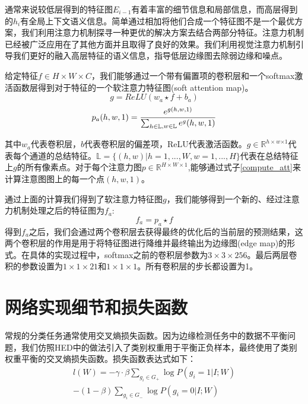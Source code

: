 \documentclass[master]{thesis-uestc}
\begin{document}
{通常来说较低层得到的特征图$E_{i-1}$有着丰富的细节信息和局部信息，而高层得到的$h_i$有全局上下文语义信息。简单通过相加将他们合成一个特征图不是一个最优方案，我们利用注意力机制探寻一种更优的解决方案去结合两部分特征。注意力机制已经被广泛应用在了其他方面并且取得了良好的效果。我们利用视觉注意力机制引导我们更好的融入高层特征的语义信息，指导低层边缘图去除弱边缘和噪点。

给定特征$f \in H \times W \times C$，我们能够通过一个带有偏置项的卷积层和一个softmax激活函数层得到对于特征的一个软注意力特征图(soft attention map)。
\begin{equation}
    g = ReLU(w_{a} \star f + b_{a})
\end{equation}
\begin{equation}
    \label{compute_att}
    {p_{a}(h, w, 1) = \frac{e^{g(h,w, 1)}}{\sum_{\substack{h \in \mathbb{L}}\\ ,w \in \mathbb{L}}  e^{g}(h,w,1)}}
\end{equation}

其中$w_{a}$代表卷积层，$b$代表卷积层的偏差项，ReLU代表激活函数。$g \in \mathbb{R} ^{h\times w{\times 1}}$代表每个通道的总结特征。$\mathbb{L} = \{(h, w)| h = 1, ..., W, w =  1, ..., H\}$代表在总结特征上$g$的所有像素点。对于每个注意力图$p \in \mathbb{R}^{H \times W \times 1}$,能够通过式子\eqref{compute_att}来计算注意图图上的每一个点$(h,w,1)$。 

通过上面的计算我们得到了软注意力特征图$g$，我们能够得到一个新的、经过注意力机制处理之后的特征图为$f_{a}$:
\begin{equation}
    f_{a} =  p_{a} \star f 
\end{equation}
得到$f_{a}$之后，我们会通过两个卷积层去获得最终的优化后的当前层的预测结果，这两个卷积层的作用是用于将特征图进行降维并最终输出为边缘图(edge map)的形式。在具体的实现过程中，softmax之前的卷积层参数为$3 \times 3 \times 256$。最后两层卷积的参数设置为$1 \times 1 \times 21$和$1 \times 1 \times 1$。所有卷积层的步长都设置为1。

\section{网络实现细节和损失函数}
常规的分类任务通常使用交叉熵损失函数。因为边缘检测任务中的数据不平衡问题，我们仿照HED中的做法引入了类别权重用于平衡正负样本，最终使用了类别权重平衡的交叉熵损失函数。损失函数表达式如下：
\begin{equation}
\begin{aligned}
    l(W) = -\gamma \cdot \beta \sum\nolimits_{g_{i} \in G_{+}}\log P(g_{i} = 1 | I ; W) \\
    - (1 - \beta) \sum\nolimits_{g_{i}\in G_{-}}\log P(g_{i} = 0 | I ; W)
\end{aligned}
\end{equation}

}
\end{document}
